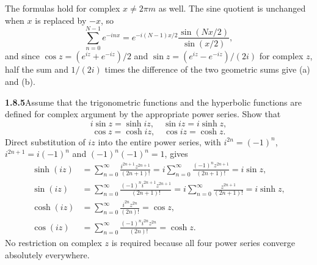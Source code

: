The formulas hold for complex $x\ne2\pi m$ as well. The sine quotient
is unchanged when $x$ is replaced by $-x$, so
\[
 \sum_{n=0}^{N-1}e^{-inx}=e^{-i(N-1)x/2}\frac{\sin(Nx/2)}{\sin(x/2)},
\]
and since $\cos z=(e^{iz}+e^{-iz})/2$ and
$\sin z=(e^{iz}-e^{-iz})/(2i)$ for complex $z$, half the sum and
$1/(2i)$ times the difference of the two geometric sums give (a) and
(b).


\par\bigskip
\noindent\textbf{1.8.5}\quad Assume that the trigonometric functions and the
hyperbolic functions are defined for complex argument by the appropriate power
series. Show that
\[
i\sin z=\sinh iz,\quad\sin iz=i\sinh z,
\]
\[
\cos z=\cosh iz,\quad\cos iz=\cosh z.
\]
\solution
Direct substitution of $iz$ into the entire power series, with
$i^{2n}=(-1)^n$, $i^{2n+1}=i(-1)^n$ and $(-1)^n(-1)^n=1$, gives
\[
 \begin{aligned}
 \sinh(iz)&=\sum_{n=0}^\infty\frac{i^{2n+1}z^{2n+1}}{(2n+1)!}
       =i\sum_{n=0}^\infty\frac{(-1)^n z^{2n+1}}{(2n+1)!}=i\sin z,\\
 \sin(iz)&=\sum_{n=0}^\infty\frac{(-1)^n i^{2n+1}z^{2n+1}}{(2n+1)!}
       =i\sum_{n=0}^\infty\frac{z^{2n+1}}{(2n+1)!}=i\sinh z,\\
 \cosh(iz)&=\sum_{n=0}^\infty\frac{i^{2n}z^{2n}}{(2n)!}=\cos z,\\
 \cos(iz)&=\sum_{n=0}^\infty\frac{(-1)^n i^{2n}z^{2n}}{(2n)!}=\cosh z.
 \end{aligned}
\]
No restriction on complex $z$ is required because all four power
series converge absolutely everywhere.


